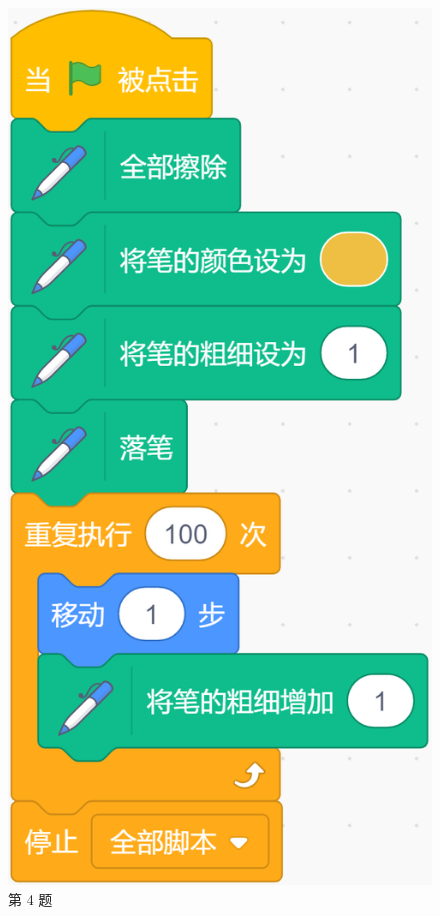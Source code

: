 \documentclass[10pt, a4paper]{article}
\begin{document}
\begin{enumerate}
\begin{figure}[htbp]
\begin{minipage}[t]{.13\textwidth}
                \centering
                \includegraphics[width=\textwidth]{4.png}
                \caption*{第 4 题}
            \end{minipage}

\end{figure}
\end{enumerate}
\end{document}
